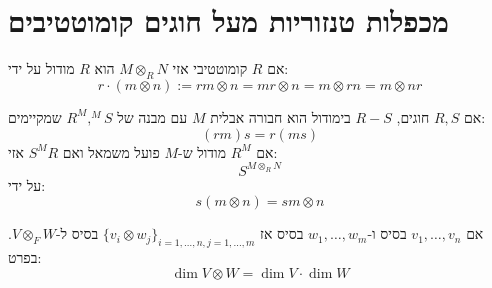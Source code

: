 \documentclass{tstextbook}
\begin{document}
\section{מכפלות טנזוריות מעל חוגים קומוטטיבים}

\begin{proposition}
אם \(R\) קומוטטיבי אזי \(M \otimes_{R} N\) הוא \(R\) מודול על ידי:
$$r \cdot (m \otimes n) := r m \otimes n = m r \otimes n = m \otimes r n = m \otimes n r$$

\end{proposition}
\begin{definition}[בי-מודול]
אם \(R, S\) חוגים, \(R-S\) בימודול הוא חבורה אבלית \(M\) עם מבנה של \(R^{M}, ^{M}S\) שמקיימים:
$$(r m)s = r(m s)$$
אם \(R^{M}\) מודול ש-\(M\) פועל משמאל ואם \(S^{M}R\) אזי:
$$S^{M \otimes_{R} N}$$
על ידי:
$$s(m \otimes n) = s m \otimes n$$

\end{definition}
\begin{proposition}
אם \(v_{1}, \dots, v_{n}\) בסיס ו-\(w_{1}, \dots, w_{m}\) בסיס אז \(\{ v_{i} \otimes w_{j} \}_{i=1,\dots,n, j=1,\dots,m}\) בסיס ל-\(V \otimes_{F} W\).
בפרט:
$$\dim V \otimes W = \dim V \cdot \dim W$$

\end{proposition}
\end{document}

